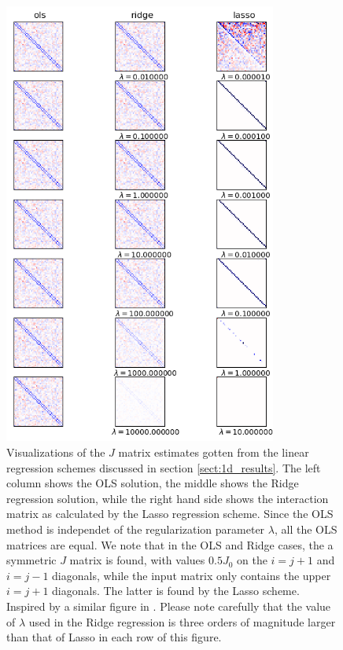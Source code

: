 \documentclass[a4paper, twocolumn]{article}
\begin{document}
\begin{figure}
  \centering
  \vspace{-1.5cm}
  \includegraphics[width=0.8\textwidth]{1D_ising_beta_imshow.png}
  \caption{Visualizations of the $J$ matrix estimates gotten from the linear regression schemes discussed in section \ref{sect:1d_results}. The left column shows the OLS solution, the middle shows the Ridge regression solution, while the right hand side shows the interaction matrix as calculated by the Lasso regression scheme. Since the OLS method is independet of the regularization parameter $\lambda$, all the OLS matrices are equal. We note that in the OLS and Ridge cases, the a symmetric $J$ matrix is found, with values $0.5J_0$ on the $i=j+1$ and $i=j-1$ diagonals, while the input matrix only contains the upper $i=j+1$ diagonals. The latter is found by the Lasso scheme. Inspired by a similar figure in \cite{mehta2018highbias}. Please note carefully that the value of $\lambda$ used in the Ridge regression is three orders of magnitude larger than that of Lasso in each row of this figure.  \label{fig:imshow}}
\end{figure}
\end{document}

